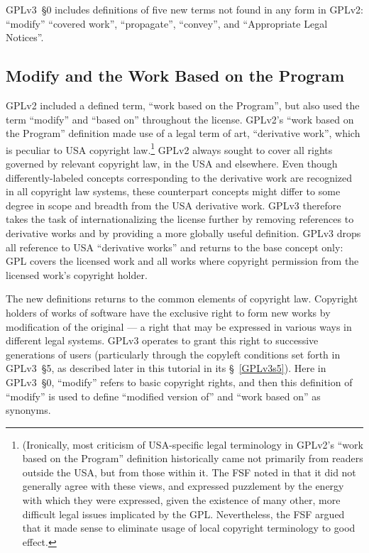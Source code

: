 GPLv3~\S0 includes definitions of five new terms not found in any form in
GPLv2: ``modify'' ``covered work'', ``propagate'', ``convey'', and
``Appropriate Legal Notices''. 

\subsection{Modify and the Work Based on the Program}


GPLv2 included a defined term, ``work based on the Program'', but also used
the term ``modify'' and ``based on'' throughout the license.  GPLv2's ``work
based on the Program'' definition made use of a legal term of art,
``derivative work'', which is peculiar to USA copyright
law.\footnote{(Ironically, most criticism of USA-specific legal
terminology in GPLv2's ``work based on the Program'' definition historically
came not primarily from readers outside the USA, but from those within
it.  The FSF noted in that it did not generally agree with these
  views, and expressed puzzlement by the energy with which they were
  expressed, given the existence of many other, more difficult legal issues
  implicated by the GPL.  Nevertheless, the FSF argued that it made sense to
  eliminate usage of local copyright terminology to good effect.}  GPLv2
always sought to cover all rights governed by relevant copyright law, in the
USA and elsewhere.
Even though differently-labeled concepts corresponding to the
derivative work are recognized in all copyright law systems, these
counterpart concepts might differ to some degree in scope and breadth from
the USA derivative work.  GPLv3 therefore takes the task of
internationalizing the license further by removing references to derivative
works and by providing a more globally useful definition.
GPLv3 drops all reference to USA ``derivative works'' and returns
to the base concept only: GPL covers the licensed work and all works where
copyright permission from the licensed work's copyright holder.

The new definitions returns to the common elements of copyright law.  Copyright
holders of works of software have the exclusive right to form new works by
modification of the original --- a right that may be expressed in various
ways in different legal systems.  GPLv3 operates to grant this right to
successive generations of users (particularly through the copyleft conditions
set forth in GPLv3~\S5, as described later in this tutorial in its
\S~\ref{GPLv3s5}).  Here in GPLv3~\S0, ``modify'' refers to basic copyright
rights, and then this definition of ``modify'' is used to define ``modified
version of'' and ``work based on'' as synonyms.

